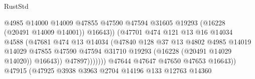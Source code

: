 \begin{lexlean}{RustStd}
\begin{coremodule}
                                                @4985
                                                @14000
                                                @14009
                                                @47855
                                                @47590
                                                @47594
                                                @31605
                                                @19293
                                                (@16228 (@20491 @14009 @14001))
                                                @16643))
                                            (@47701
                                              @474
                                              @121
                                              @13
                                              @16
                                              @14034
                                              @4588
                                              (@47681
                                                @474
                                                @13
                                                @14034
                                                (@47840
                                                  @128
                                                  @37
                                                  @13
                                                  @4802
                                                  @4985
                                                  @14019
                                                  @14029
                                                  @47855
                                                  @47590
                                                  @47594
                                                  @31710
                                                  @19293
                                                  (@16228 (@20491 @14029 @14020))
                                                  @16643))
                                              @47897)))))))
                                @47644
                                @47647
                                @47650
                                @47653
                                @16643))
                            @47915
                            (@47925
                              @3938
                              @3963
                              @2704
                              @14196
                              @133
                              @12763
                              @14360

\end{coremodule}
\end{lexlean}
